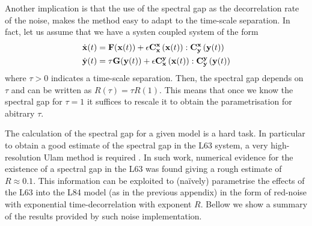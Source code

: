 \documentclass[12pt]{article}
\begin{document}
Another implication is that the use of the spectral gap as the decorrelation rate of the noise, makes the method easy to adapt to the time-scale separation. In fact, let us assume that we have a systen coupled system of the form
\begin{align}
\dot{\mathbf{x}}(t) &= \mathbf{F}(\mathbf{x}(t)) + \epsilon \mathbf{C}_{\mathbf{x}}^{\mathbf{x}}\left(\mathbf{x}(t) \right) : \mathbf{C}_{\mathbf{y}}^{\mathbf{x}}\left(\mathbf{y}(t) \right) \\
\dot{\mathbf{y}}(t) &= \tau \mathbf{G}(\mathbf{y}(t)) + \epsilon \mathbf{C}_{\mathbf{x}}^{\mathbf{y}}\left(\mathbf{x}(t) \right):\mathbf{C}_{\mathbf{y}}^{\mathbf{y}}\left(\mathbf{y}(t) \right)
\end{align}
where $\tau>0$ indicates a time-scale separation. Then, the spectral gap depends on $\tau$ and can be written as $R(\tau)=\tau R(1)$. This means that once we know the spectral gap for $\tau =1$ it suffices to rescale it to obtain the parametrisation for abitrary $\tau$.

The calculation of the spectral gap for a given model is a hard task. In particular to obtain a good estimate of the spectral gap in the L63 system, a very high-resolution Ulam method is required \cite{Tantet2018}. In such work, numerical evidence for the existence of a spectral gap in the L63 was found giving a rough estimate of $R\approx 0.1$. This information can be exploited to (naïvely) parametrise the effects of the L63 into the L84 model (as in the previous appendix) in the form of red-noise with exponential time-decorrelation with exponent $R$. Bellow we show a summary of the results provided by such noise implementation.
\end{document}

